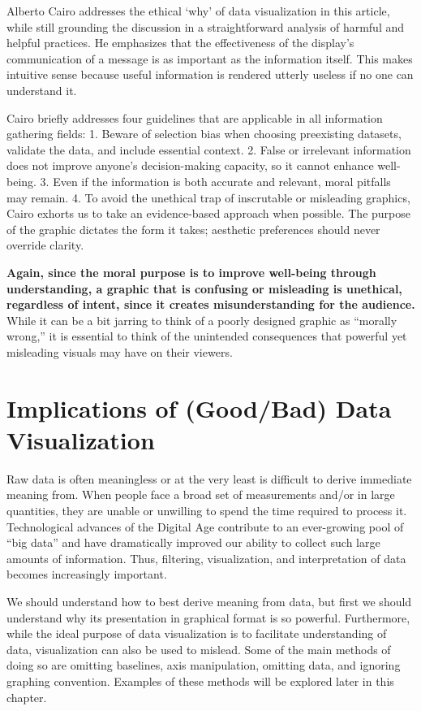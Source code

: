 \documentclass[]{book}
\theoremstyle{definition}
\theoremstyle{definition}
\theoremstyle{definition}
\theoremstyle{remark}
\begin{document}
Alberto Cairo addresses the ethical `why' of data visualization in this
article, while still grounding the discussion in a straightforward
analysis of harmful and helpful practices. He emphasizes that the
effectiveness of the display's communication of a message is as
important as the information itself. This makes intuitive sense because
useful information is rendered utterly useless if no one can understand
it.

Cairo briefly addresses four guidelines that are applicable in all
information gathering fields: 1. Beware of selection bias when choosing
preexisting datasets, validate the data, and include essential context.
2. False or irrelevant information does not improve anyone's
decision-making capacity, so it cannot enhance well-being. 3. Even if
the information is both accurate and relevant, moral pitfalls may
remain. 4. To avoid the unethical trap of inscrutable or misleading
graphics, Cairo exhorts us to take an evidence-based approach when
possible. The purpose of the graphic dictates the form it takes;
aesthetic preferences should never override clarity.

\textbf{Again, since the moral purpose is to improve well-being through
understanding, a graphic that is confusing or misleading is unethical,
regardless of intent, since it creates misunderstanding for the
audience.} While it can be a bit jarring to think of a poorly designed
graphic as ``morally wrong,'' it is essential to think of the unintended
consequences that powerful yet misleading visuals may have on their
viewers.

\section{Implications of (Good/Bad) Data
Visualization}\label{implications-of-goodbad-data-visualization}

Raw data is often meaningless or at the very least is difficult to
derive immediate meaning from. When people face a broad set of
measurements and/or in large quantities, they are unable or unwilling to
spend the time required to process it. Technological advances of the
Digital Age contribute to an ever-growing pool of ``big data'' and have
dramatically improved our ability to collect such large amounts of
information. Thus, filtering, visualization, and interpretation of data
becomes increasingly important.

We should understand how to best derive meaning from data, but first we
should understand why its presentation in graphical format is so
powerful. Furthermore, while the ideal purpose of data visualization is
to facilitate understanding of data, visualization can also be used to
mislead. Some of the main methods of doing so are omitting baselines,
axis manipulation, omitting data, and ignoring graphing convention.
Examples of these methods will be explored later in this chapter.
\end{document}
